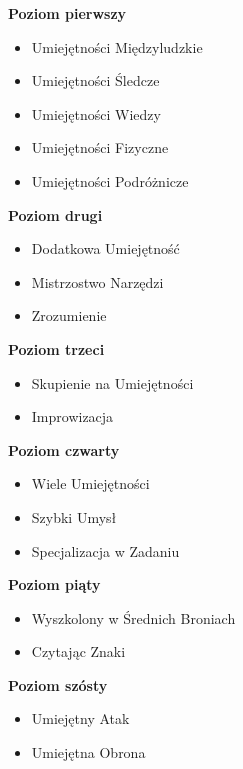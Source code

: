 \textbf{Poziom pierwszy}
\begin{itemize}
\item Umiejętności Międzyludzkie
\item Umiejętności Śledcze
\item Umiejętności Wiedzy
\item Umiejętności Fizyczne
\item Umiejętności Podróżnicze
\end{itemize}


\textbf{Poziom drugi}
\begin{itemize}
\item Dodatkowa Umiejętność
\item Mistrzostwo Narzędzi
\item Zrozumienie
\end{itemize}

\textbf{Poziom trzeci}
\begin{itemize}
\item Skupienie na Umiejętności
\item Improwizacja
\end{itemize}

\textbf{Poziom czwarty}
\begin{itemize}
\item Wiele Umiejętności
\item Szybki Umysł
\item Specjalizacja w Zadaniu
\end{itemize}

\textbf{Poziom piąty}
\begin{itemize}
\item Wyszkolony w Średnich Broniach
\item Czytając Znaki
\end{itemize}

\textbf{Poziom szósty}
\begin{itemize}
\item Umiejętny Atak
\item Umiejętna Obrona
\end{itemize}

